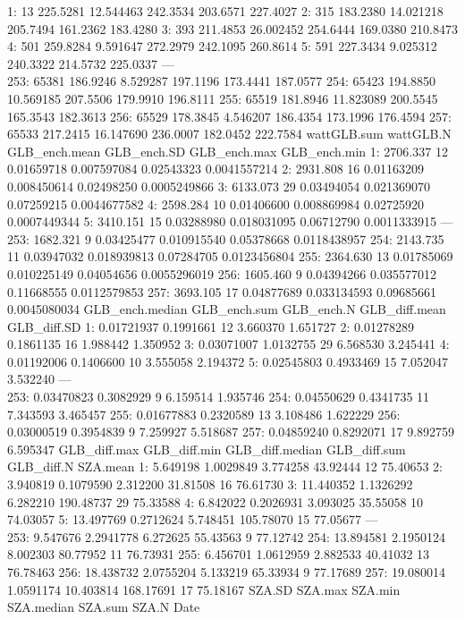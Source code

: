 \documentclass[
  10pt,
  a4paper,oneside]{article}
\begin{document}
1: 13 225.5281 12.544463 242.3534 203.6571 227.4027
2: 315 183.2380 14.021218 205.7494 161.2362 183.4280
3: 393 211.4853 26.002452 254.6444 169.0380 210.8473
4: 501 259.8284 9.591647 272.2979 242.1095 260.8614
5: 591 227.3434 9.025312 240.3322 214.5732 225.0337
---\\
253: 65381 186.9246 8.529287 197.1196 173.4441 187.0577
254: 65423 194.8850 10.569185 207.5506 179.9910 196.8111
255: 65519 181.8946 11.823089 200.5545 165.3543 182.3613
256: 65529 178.3845 4.546207 186.4354 173.1996 176.4594
257: 65533 217.2415 16.147690 236.0007 182.0452 222.7584
wattGLB.sum wattGLB.N GLB\_ench.mean GLB\_ench.SD GLB\_ench.max GLB\_ench.min
1: 2706.337 12 0.01659718 0.007597084 0.02543323 0.0041557214
2: 2931.808 16 0.01163209 0.008450614 0.02498250 0.0005249866
3: 6133.073 29 0.03494054 0.021369070 0.07259215 0.0044677582
4: 2598.284 10 0.01406600 0.008869984 0.02725920 0.0007449344
5: 3410.151 15 0.03288980 0.018031095 0.06712790 0.0011333915
---\\
253: 1682.321 9 0.03425477 0.010915540 0.05378668 0.0118438957
254: 2143.735 11 0.03947032 0.018939813 0.07284705 0.0123456804
255: 2364.630 13 0.01785069 0.010225149 0.04054656 0.0055296019
256: 1605.460 9 0.04394266 0.035577012 0.11668555 0.0112579853
257: 3693.105 17 0.04877689 0.033134593 0.09685661 0.0045080034
GLB\_ench.median GLB\_ench.sum GLB\_ench.N GLB\_diff.mean GLB\_diff.SD
1: 0.01721937 0.1991661 12 3.660370 1.651727
2: 0.01278289 0.1861135 16 1.988442 1.350952
3: 0.03071007 1.0132755 29 6.568530 3.245441
4: 0.01192006 0.1406600 10 3.555058 2.194372
5: 0.02545803 0.4933469 15 7.052047 3.532240
---\\
253: 0.03470823 0.3082929 9 6.159514 1.935746
254: 0.04550629 0.4341735 11 7.343593 3.465457
255: 0.01677883 0.2320589 13 3.108486 1.622229
256: 0.03000519 0.3954839 9 7.259927 5.518687
257: 0.04859240 0.8292071 17 9.892759 6.595347
GLB\_diff.max GLB\_diff.min GLB\_diff.median GLB\_diff.sum GLB\_diff.N SZA.mean
1: 5.649198 1.0029849 3.774258 43.92444 12 75.40653
2: 3.940819 0.1079590 2.312200 31.81508 16 76.61730
3: 11.440352 1.1326292 6.282210 190.48737 29 75.33588
4: 6.842022 0.2026931 3.093025 35.55058 10 74.03057
5: 13.497769 0.2712624 5.748451 105.78070 15 77.05677
---\\
253: 9.547676 2.2941778 6.272625 55.43563 9 77.12742
254: 13.894581 2.1950124 8.002303 80.77952 11 76.73931
255: 6.456701 1.0612959 2.882533 40.41032 13 76.78463
256: 18.438732 2.0755204 5.133219 65.33934 9 77.17689
257: 19.080014 1.0591174 10.403814 168.17691 17 75.18167
SZA.SD SZA.max SZA.min SZA.median SZA.sum SZA.N Date
\end{document}
